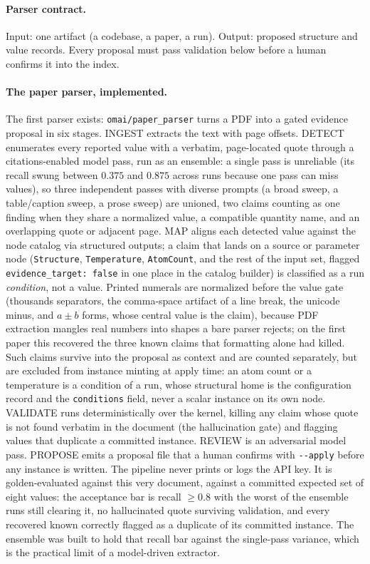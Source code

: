 \documentclass[11pt,a4paper]{article}
\begin{document}
\paragraph{Parser contract.} Input: one artifact (a codebase, a paper, a run). Output:
proposed structure and value records. Every proposal must pass validation below
before a human confirms it into the index.

\paragraph{The paper parser, implemented.} The first parser exists:
\texttt{omai/paper\_parser} turns a PDF into a gated evidence proposal in six
stages. INGEST extracts the text with page offsets. DETECT enumerates every
reported value with a verbatim, page-located quote through a citations-enabled
model pass, run as an ensemble: a single pass is unreliable (its recall swung
between $0.375$ and $0.875$ across runs because one pass can miss values), so
three independent passes with diverse prompts (a broad sweep, a table/caption
sweep, a prose sweep) are unioned, two claims counting as one finding when they
share a normalized value, a compatible quantity name, and an overlapping quote or
adjacent page. MAP aligns each detected value against the node catalog via
structured outputs; a claim that lands on a source or parameter node
(\texttt{Structure}, \texttt{Temperature}, \texttt{AtomCount}, and the rest of
the input set, flagged \texttt{evidence\_target: false} in one place in the
catalog builder) is classified as a run \emph{condition}, not a value. Printed
numerals are normalized before the value gate (thousands separators, the
comma-space artifact of a line break, the unicode minus, and $a \pm b$ forms,
whose central value is the claim), because PDF extraction mangles real numbers
into shapes a bare parser rejects; on the first paper this recovered the three
known claims that formatting alone had killed. Such
claims survive into the proposal as context and are counted separately, but are
excluded from instance minting at apply time: an atom count or a temperature is a
condition of a run, whose structural home is the configuration record and the
\texttt{conditions} field, never a scalar instance on its own node. VALIDATE runs deterministically over the kernel, killing any
claim whose quote is not found verbatim in the document (the hallucination gate)
and flagging values that duplicate a committed instance. REVIEW is an adversarial
model pass. PROPOSE emits a proposal file that a human confirms with
\texttt{-{}-apply} before any instance is written. The pipeline never prints or logs
the API key. It is golden-evaluated against this very document, against a
committed expected set of eight values: the acceptance bar is recall $\ge 0.8$
with the worst of the ensemble runs still clearing it, no hallucinated quote
surviving validation, and every recovered known correctly flagged as a duplicate
of its committed instance. The ensemble was built to hold that recall bar against
the single-pass variance, which is the practical limit of a model-driven extractor.
\end{document}
